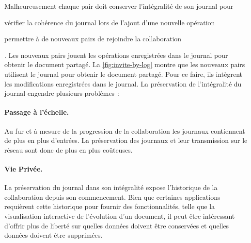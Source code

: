 Malheureusement chaque pair doit conserver l'intégralité de son journal pour \begin{inlinelist}
    \item vérifier la cohérence du journal lors de l'ajout d'une nouvelle opération
    \item permettre à de nouveaux pairs de rejoindre la collaboration
\end{inlinelist}.
Les nouveaux pairs jouent les opérations enregistrées dans le journal pour obtenir le document partagé.
La \autoref{fig:invite-by-log} montre que les nouveaux pairs utilisent le journal pour obtenir le document partagé.
Pour ce faire, ils intègrent les modifications enregistrées dans le journal.
La préservation de l'intégralité du journal engendre plusieurs problèmes~:

\paragraph{Passage à l'échelle.} Au fur et à mesure de la progression de la collaboration les journaux contiennent de plus en plus d'entrées.
La préservation des journaux et leur transmission sur le réseau sont donc de plus en plus coûteuses.

\paragraph{Vie Privée.} La préservation du journal dans son intégralité expose l'historique de la collaboration depuis son commencement.
Bien que certaines applications requièrent cette historique pour fournir des fonctionnalités, telle que la visualisation interactive de l'évolution d'un document, il peut être intéressant d'offrir plus de liberté sur quelles données doivent être conservées et quelles données doivent être supprimées.

\bigskip

